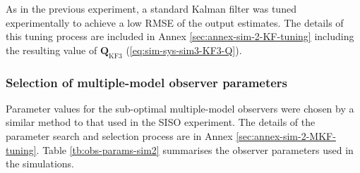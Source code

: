 As in the previous experiment, a standard Kalman filter was tuned experimentally to achieve a low \gls{RMSE} of the output estimates. The details of this tuning process are included in Annex \ref{sec:annex-sim-2-KF-tuning} including the resulting value of $\mathbf{Q}_{\text{KF3}}$ (\ref{eq:sim-sys-sim3-KF3-Q}).


\subsubsection{Selection of multiple-model observer parameters} \label{sec:sim-obs-lin-2-MKF-tuning}

Parameter values for the sub-optimal multiple-model observers were chosen by a similar method to that used in the SISO experiment. The details of the parameter search and selection process are in Annex \ref{sec:annex-sim-2-MKF-tuning}. Table \ref{tb:obs-params-sim2} summarises the observer parameters used in the simulations.
